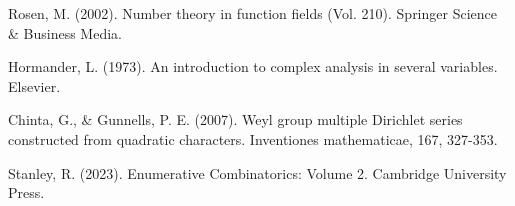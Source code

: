 \documentclass[12pt,reqno,oneside]{amsart}
\begin{document}
\begin{thebibliography}{99}
    Rosen, M. (2002). Number theory in function fields (Vol. 210). Springer Science \& Business Media.

    Hormander, L. (1973). An introduction to complex analysis in several variables. Elsevier.

    Chinta, G., \& Gunnells, P. E. (2007). Weyl group multiple Dirichlet series constructed from quadratic characters. Inventiones mathematicae, 167, 327-353.

    Stanley, R. (2023). Enumerative Combinatorics: Volume 2. Cambridge University Press.
\end{thebibliography}
\end{document}
